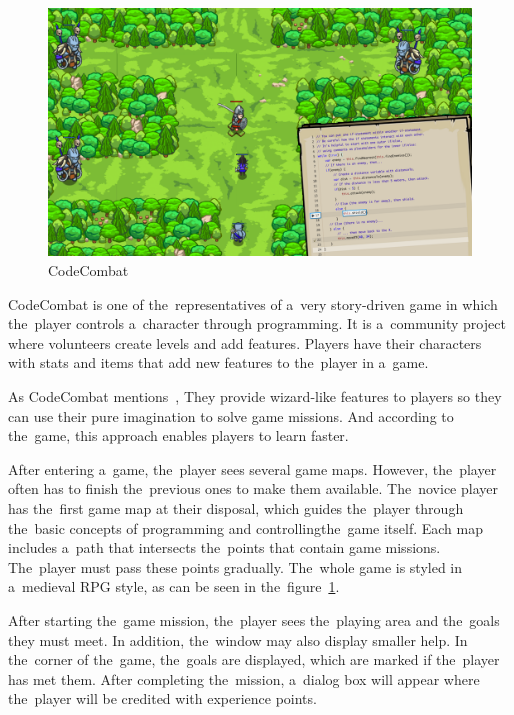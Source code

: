 \begin{figure}
    \centering
    \includegraphics[width=1\linewidth]{assets/similar-games/codecombat.png}
    \caption{CodeCombat~\cite{a2022_codecombat}}
    \label{fig:codecombat}
\end{figure}

CodeCombat is one of the~representatives of a~very story-driven game in which the~player controls a~character through programming.
It is a~community project where volunteers create levels and add features.
Players have their characters with stats and items that add new features to the~player in a~game.

As CodeCombat mentions~\cite{a2022_codecombat}, 
They provide wizard-like features to players so they can use their pure imagination to solve game missions.
And according to the~game, this approach enables players to learn faster.

After entering a~game, the~player sees several game maps.
However, the~player often has to finish the~previous ones to make them available.
The~novice player has the~first game map at their disposal, which guides the~player through the~basic concepts of programming and controlling\linebreak{}the~game itself.
Each map includes a~path that intersects the~points that contain game missions.
The~player must pass these points gradually.
The~whole game is styled in a~medieval RPG style, as can be seen in the~figure~\ref{fig:codecombat}.

After starting the~game mission, the~player sees the~playing area and the~goals they must meet.
In addition, the~window may also display smaller help.
In the~corner of the~game, the~goals are displayed, which are marked if the~player has met them.
After completing the~mission, a~dialog box will appear where the~player will be credited with experience points.


